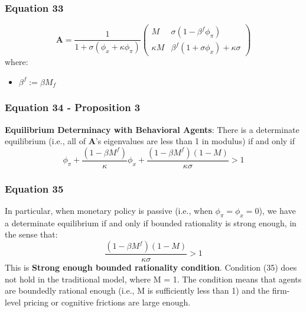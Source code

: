 \documentclass{article}
\begin{document}
\subsubsection*{Equation 33}
\begin{equation}\tag{33}
    \textbf{A}=\frac{1}{1+\sigma(\phi_{x}+\kappa\phi_{\pi})}\begin{pmatrix} M & \sigma(1-\beta^{f}\phi_{\pi}) \\ \kappa M & \beta^{f}(1+\sigma\phi_{x})+\kappa\sigma \end{pmatrix}
\end{equation}
where:
\begin{itemize}
    \item $\beta^{f}:=\beta M_{f}$
\end{itemize}

\subsubsection*{Equation 34 - Proposition 3}
\textbf{Equilibrium Determinacy with Behavioral Agents}: There is a determinate equilibrium (i.e., all of $\textbf{A}$’s eigenvalues are less than 1 in modulus) if and only if
\begin{equation}\tag{34}
    \phi_{\pi}+\frac{(1-\beta M^{f})}{\kappa}\phi_{x}+\frac{(1-\beta M^{f})(1-M)}{\kappa\sigma}>1
\end{equation}

\subsubsection*{Equation 35}
In particular, when monetary policy is passive (i.e., when $\phi_{\pi}=\phi_{x}=0$), we
have a determinate equilibrium if and only if bounded rationality is strong enough, in the sense that:
\begin{equation}\tag{35}
    \frac{(1-\beta M^{f})(1-M)}{\kappa\sigma}>1
\end{equation}
This is \textbf{Strong enough bounded rationality condition}. Condition (35) does not hold in the traditional model, where M = 1. The condition
means that agents are boundedly rational enough (i.e., M is sufficiently less than
1) and the firm-level pricing or cognitive frictions are large enough.
\end{document}
